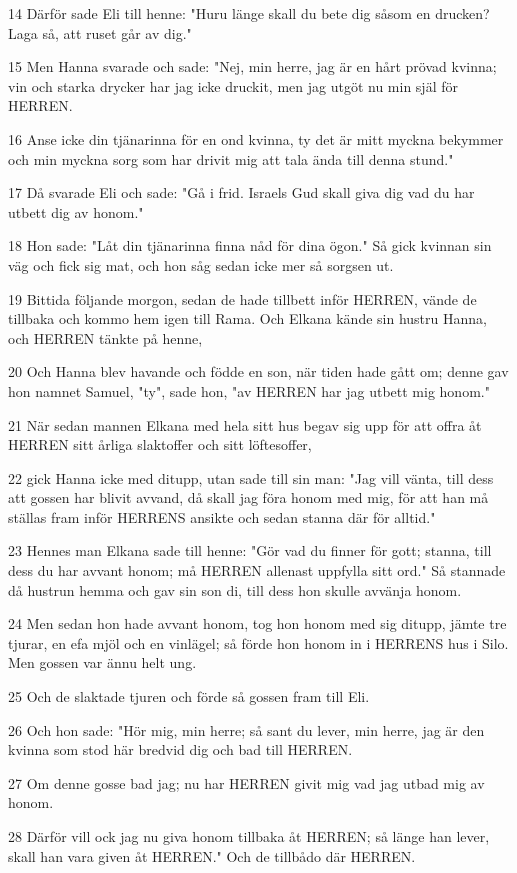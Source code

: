 \par 14 Därför sade Eli till henne: "Huru länge skall du bete dig såsom en drucken? Laga så, att ruset går av dig."
\par 15 Men Hanna svarade och sade: "Nej, min herre, jag är en hårt prövad kvinna; vin och starka drycker har jag icke druckit, men jag utgöt nu min själ för HERREN.
\par 16 Anse icke din tjänarinna för en ond kvinna, ty det är mitt myckna bekymmer och min myckna sorg som har drivit mig att tala ända till denna stund."
\par 17 Då svarade Eli och sade: "Gå i frid. Israels Gud skall giva dig vad du har utbett dig av honom."
\par 18 Hon sade: "Låt din tjänarinna finna nåd för dina ögon." Så gick kvinnan sin väg och fick sig mat, och hon såg sedan icke mer så sorgsen ut.
\par 19 Bittida följande morgon, sedan de hade tillbett inför HERREN, vände de tillbaka och kommo hem igen till Rama. Och Elkana kände sin hustru Hanna, och HERREN tänkte på henne,
\par 20 Och Hanna blev havande och födde en son, när tiden hade gått om; denne gav hon namnet Samuel, "ty", sade hon, "av HERREN har jag utbett mig honom."
\par 21 När sedan mannen Elkana med hela sitt hus begav sig upp för att offra åt HERREN sitt årliga slaktoffer och sitt löftesoffer,
\par 22 gick Hanna icke med ditupp, utan sade till sin man: "Jag vill vänta, till dess att gossen har blivit avvand, då skall jag föra honom med mig, för att han må ställas fram inför HERRENS ansikte och sedan stanna där för alltid."
\par 23 Hennes man Elkana sade till henne: "Gör vad du finner för gott; stanna, till dess du har avvant honom; må HERREN allenast uppfylla sitt ord." Så stannade då hustrun hemma och gav sin son di, till dess hon skulle avvänja honom.
\par 24 Men sedan hon hade avvant honom, tog hon honom med sig ditupp, jämte tre tjurar, en efa mjöl och en vinlägel; så förde hon honom in i HERRENS hus i Silo. Men gossen var ännu helt ung.
\par 25 Och de slaktade tjuren och förde så gossen fram till Eli.
\par 26 Och hon sade: "Hör mig, min herre; så sant du lever, min herre, jag är den kvinna som stod här bredvid dig och bad till HERREN.
\par 27 Om denne gosse bad jag; nu har HERREN givit mig vad jag utbad mig av honom.
\par 28 Därför vill ock jag nu giva honom tillbaka åt HERREN; så länge han lever, skall han vara given åt HERREN." Och de tillbådo där HERREN.

